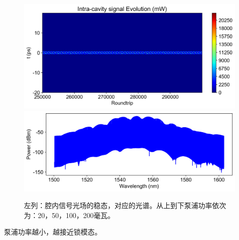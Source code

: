 \begin{figure}[htbp]
    \includegraphics[width=0.48\linewidth]{figure/fig_20.png}
    \includegraphics[width=0.48\linewidth]{figure/fig_20_0.png}
    \caption{左列：腔内信号光场的稳态，对应的光谱。从上到下泵浦功率依次为：20，50，100，200毫瓦。}
    \label{fig:enter-label}
\end{figure}
泵浦功率越小，越接近锁模态。
